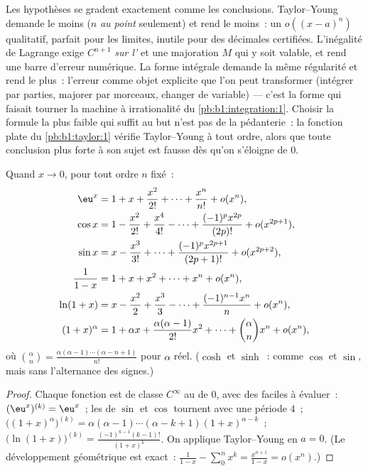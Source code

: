 \begin{remark}
Les hypothèses se gradent exactement comme les conclusions.
Taylor--Young demande le moins ($n$  \emph{au point}
seulement) et rend le moins~: un $o((x-a)^n)$ qualitatif,
parfait pour les limites, inutile pour des décimales certifiées.
L'inégalité de Lagrange exige $C^{n+1}$ \emph{sur l'} et
une majoration $M$ qui y soit valable, et rend une barre d'erreur
numérique. La forme intégrale demande la même régularité et rend le
plus~: l'erreur comme objet explicite que l'on peut transformer
(intégrer par parties, majorer par morceaux, changer de variable)
--- c'est la forme qui faisait tourner la machine à irrationalité du
\cref{pb:b1:integration:1}. Choisir la formule la plus faible qui
suffit au but n'est pas de la pédanterie~: la fonction plate du
\cref{pb:b1:taylor:1} vérifie Taylor--Young à tout ordre, alors que
toute conclusion plus forte à son sujet est fausse dès qu'on
s'éloigne de $0$.
\end{remark}

\begin{proposition}
Quand $x \to 0$, pour tout ordre $n$ fixé~:
\begin{align*}
\eu^x &= 1 + x + \frac{x^2}{2!} + \dots + \frac{x^n}{n!} + o(x^n),\\
\cos x &= 1 - \frac{x^2}{2!} + \frac{x^4}{4!} - \dots
+ \frac{(-1)^p x^{2p}}{(2p)!} + o(x^{2p+1}),\\
\sin x &= x - \frac{x^3}{3!} + \dots + \frac{(-1)^p
x^{2p+1}}{(2p+1)!} + o(x^{2p+2}),\\
\frac{1}{1 - x} &= 1 + x + x^2 + \dots + x^n + o(x^n),\\
\ln(1 + x) &= x - \frac{x^2}{2} + \frac{x^3}{3} - \dots +
\frac{(-1)^{n-1} x^n}{n} + o(x^n),\\
(1 + x)^\alpha &= 1 + \alpha x + \frac{\alpha(\alpha-1)}{2!}x^2 +
\dots + \binom{\alpha}{n} x^n + o(x^n),
\end{align*}
où $\binom{\alpha}{n} = \frac{\alpha(\alpha - 1)\cdots(\alpha - n
+ 1)}{n!}$ pour $\alpha$ réel. ($\cosh$ et $\sinh$~: comme $\cos$ et
$\sin$, mais sans l'alternance des signes.)
\label{prop:b1:taylor:standard}
\end{proposition}

\begin{proof}
Chaque fonction est de classe $C^\infty$ au  de $0$, avec des
 faciles à évaluer~: $(\eu^x)^{(k)} = \eu^x$~; les  de
$\sin$ et $\cos$ tournent avec une période $4$~;
$\bigl((1+x)^\alpha\bigr)^{(k)} = \alpha(\alpha -
1)\cdots(\alpha - k + 1)(1+x)^{\alpha - k}$~;
$\bigl(\ln(1+x)\bigr)^{(k)} = \frac{(-1)^{k-1}(k-1)!}{(1+x)^k}$.
On applique Taylor--Young en $a = 0$. (Le développement géométrique
est exact~: $\frac{1}{1-x} - \sum_0^n x^k = \frac{x^{n+1}}{1 - x} =
o(x^n)$.)
\end{proof}

